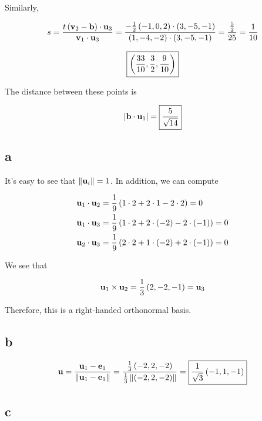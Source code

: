 \documentclass{article}
\begin{document}
Similarly,

$$
s = \frac{ t \left ( \textbf{v}_2 - \textbf{b}  \right) \cdot \textbf{u}_3 }{\textbf{v}_1 \cdot \textbf{u}_3} = \frac{- \frac{1}{2} \left ( -1, 0, 2 \right) \cdot \left ( 3, -5, -1 \right)}{\left ( 1, -4, -2 \right) \cdot \left ( 3, -5, -1 \right)} = \frac{\frac{5}{2}}{25}  = \frac{1}{10}
$$

$$
\boxed{\left ( \frac{33}{10}, \frac{3}{2}, \frac{9}{10} \right)}
$$

The distance between these points is

$$
\left\lvert \textbf{b} \cdot \textbf{u}_1 \right\rvert = \boxed{\frac{5}{\sqrt{14}}}
$$



\subsection*{a}

It's easy to see that $\left\lVert\textbf{u}_i\right\rVert = 1$.
In addition, we can compute

\begin{align*}
  \textbf{u}_1 \cdot \textbf{u}_2 &= \frac{1}{9} \left ( 1 \cdot 2 + 2 \cdot 1 - 2 \cdot 2 \right) = 0 \\
  \textbf{u}_1 \cdot \textbf{u}_3 &= \frac{1}{9} \left ( 1 \cdot 2 + 2 \cdot \left ( -2 \right) -2 \cdot \left ( -1 \right) \right) = 0 \\
  \textbf{u}_2 \cdot \textbf{u}_3 &= \frac{1}{9} \left ( 2 \cdot 2 + 1 \cdot \left ( -2 \right) + 2 \cdot \left ( -1 \right) \right) = 0 \\
\end{align*}

We see that

$$
\textbf{u}_1 \times \textbf{u}_2 = \frac{1}{3} \left ( 2, -2, -1 \right) = \textbf{u}_3
$$

Therefore, this is a right-handed orthonormal basis.

\subsection*{b}

$$
\textbf{u} = \frac{\textbf{u}_1 - \textbf{e}_1}{\left\lVert\textbf{u}_1 - \textbf{e}_1\right\rVert} = \frac{\frac{1}{3} \left ( -2, 2, -2 \right)}{\frac{1}{3} \left\lVert\left ( -2, 2, -2 \right)\right\rVert} = \boxed{\frac{1}{\sqrt{3}} \left ( -1, 1, -1 \right)}
$$

\subsection*{c}
\end{document}
